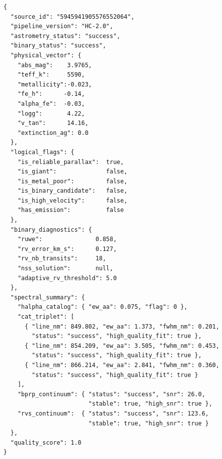 \begin{lstlisting}[style=json,caption={Contrato HC-2.0 para \emph{mu~Ara}
  (HD~160691, \texttt{source\_id}~5945941905576552064). Todos los campos son
  generados por los cuatro agentes deterministas sin intervencion del LLM.},
  label=lst:hc-contract,float=ht]
{
  "source_id": "5945941905576552064",
  "pipeline_version": "HC-2.0",
  "astrometry_status": "success",
  "binary_status": "success",
  "physical_vector": {
    "abs_mag":    3.9765,
    "teff_k":     5590,
    "metallicity":-0.023,
    "fe_h":      -0.14,
    "alpha_fe":  -0.03,
    "logg":       4.22,
    "v_tan":      14.16,
    "extinction_ag": 0.0
  },
  "logical_flags": {
    "is_reliable_parallax":  true,
    "is_giant":              false,
    "is_metal_poor":         false,
    "is_binary_candidate":   false,
    "is_high_velocity":      false,
    "has_emission":          false
  },
  "binary_diagnostics": {
    "ruwe":               0.858,
    "rv_error_km_s":      0.127,
    "rv_nb_transits":     18,
    "nss_solution":       null,
    "adaptive_rv_threshold": 5.0
  },
  "spectral_summary": {
    "halpha_catalog": { "ew_aa": 0.075, "flag": 0 },
    "cat_triplet": [
      { "line_nm": 849.802, "ew_aa": 1.373, "fwhm_nm": 0.201,
        "status": "success", "high_quality_fit": true },
      { "line_nm": 854.209, "ew_aa": 3.505, "fwhm_nm": 0.453,
        "status": "success", "high_quality_fit": true },
      { "line_nm": 866.214, "ew_aa": 2.841, "fwhm_nm": 0.360,
        "status": "success", "high_quality_fit": true }
    ],
    "bprp_continuum": { "status": "success", "snr": 26.0,
                        "stable": true, "high_snr": true },
    "rvs_continuum":  { "status": "success", "snr": 123.6,
                        "stable": true, "high_snr": true }
  },
  "quality_score": 1.0
}
\end{lstlisting}

